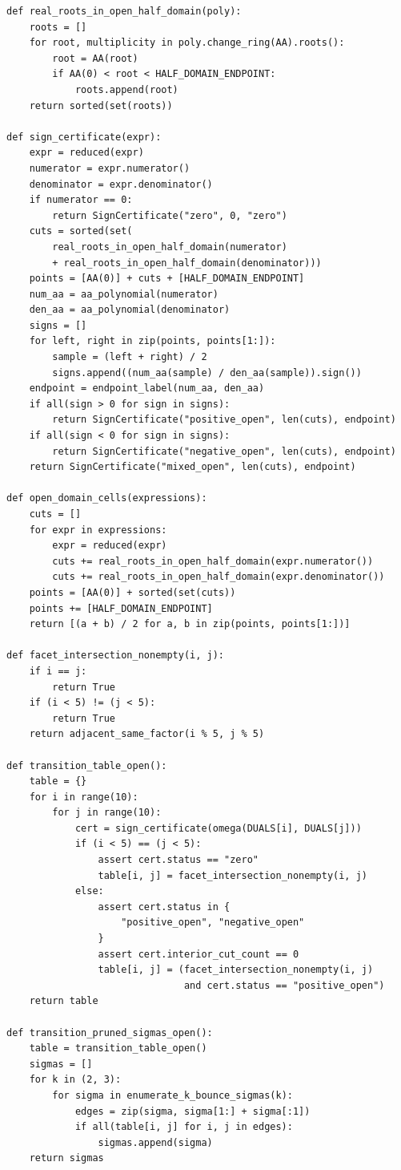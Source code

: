 {\small
\begin{verbatim}
def real_roots_in_open_half_domain(poly):
    roots = []
    for root, multiplicity in poly.change_ring(AA).roots():
        root = AA(root)
        if AA(0) < root < HALF_DOMAIN_ENDPOINT:
            roots.append(root)
    return sorted(set(roots))

def sign_certificate(expr):
    expr = reduced(expr)
    numerator = expr.numerator()
    denominator = expr.denominator()
    if numerator == 0:
        return SignCertificate("zero", 0, "zero")
    cuts = sorted(set(
        real_roots_in_open_half_domain(numerator)
        + real_roots_in_open_half_domain(denominator)))
    points = [AA(0)] + cuts + [HALF_DOMAIN_ENDPOINT]
    num_aa = aa_polynomial(numerator)
    den_aa = aa_polynomial(denominator)
    signs = []
    for left, right in zip(points, points[1:]):
        sample = (left + right) / 2
        signs.append((num_aa(sample) / den_aa(sample)).sign())
    endpoint = endpoint_label(num_aa, den_aa)
    if all(sign > 0 for sign in signs):
        return SignCertificate("positive_open", len(cuts), endpoint)
    if all(sign < 0 for sign in signs):
        return SignCertificate("negative_open", len(cuts), endpoint)
    return SignCertificate("mixed_open", len(cuts), endpoint)

def open_domain_cells(expressions):
    cuts = []
    for expr in expressions:
        expr = reduced(expr)
        cuts += real_roots_in_open_half_domain(expr.numerator())
        cuts += real_roots_in_open_half_domain(expr.denominator())
    points = [AA(0)] + sorted(set(cuts))
    points += [HALF_DOMAIN_ENDPOINT]
    return [(a + b) / 2 for a, b in zip(points, points[1:])]

def facet_intersection_nonempty(i, j):
    if i == j:
        return True
    if (i < 5) != (j < 5):
        return True
    return adjacent_same_factor(i % 5, j % 5)

def transition_table_open():
    table = {}
    for i in range(10):
        for j in range(10):
            cert = sign_certificate(omega(DUALS[i], DUALS[j]))
            if (i < 5) == (j < 5):
                assert cert.status == "zero"
                table[i, j] = facet_intersection_nonempty(i, j)
            else:
                assert cert.status in {
                    "positive_open", "negative_open"
                }
                assert cert.interior_cut_count == 0
                table[i, j] = (facet_intersection_nonempty(i, j)
                               and cert.status == "positive_open")
    return table

def transition_pruned_sigmas_open():
    table = transition_table_open()
    sigmas = []
    for k in (2, 3):
        for sigma in enumerate_k_bounce_sigmas(k):
            edges = zip(sigma, sigma[1:] + sigma[:1])
            if all(table[i, j] for i, j in edges):
                sigmas.append(sigma)
    return sigmas
\end{verbatim}
}

